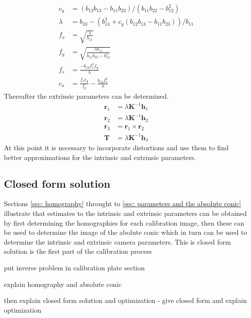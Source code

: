 \begin{align}
	c_y &= (b_{12} b_{13} - b_{11} b_{23})/(b_{11} b_{22} - b_{12}^2) \\
	\lambda &= b_{33} -(b_{13}^2 + c_y(b_{12} b_{13} - b_{11} b_{23}))/b_{11}\\
	f_x &= \sqrt{\frac{\lambda}{b_{11}}} \\
	f_y &= \sqrt{\frac{\lambda b_{11}}{b_{11} b_{22} - b_{12}^2}} \\
	f_s &= \frac{-b_{12} f_x^2 f_y}{\lambda} \\
	c_x &= \frac{f_s c_y}{f_y} - \frac{b_{13} f_x^2}{\lambda}
\end{align}
Thereafter the extrinsic parameters can be determined.
\begin{align}
	\bm{r}_1 &= \lambda \bm{K}^{-1} \bm{h}_1 \\
	\bm{r}_2 &= \lambda \bm{K}^{-1} \bm{h}_2 \\
	\bm{r}_3 &= \bm{r}_1 \times \bm{r}_2 \\
	\bm{T} &= \lambda \bm{K}^{-1} \bm{h}_3
\end{align}
At this point it is necessary to incorporate distortions and use them to find better approximations for the intrinsic and extrinsic parameters.


\subsection{Closed form solution}
Sections \ref{sec: homography} throught to \ref{sec: parameters and the absolute conic} illustrate that estimates to the intrinsic and extrinsic parameters can be obtained by first determining the homographies for each calibration image, then these can be used to determine the image of the abolute conic which in turn can be used to determine the intrinsic and extrinsic camera parameters. This is closed form solution is the first part of the calibration process

put inverse problem in calibration plate section

explain homography and absolute conic

then explain closed form solution and optimization - give closed form and explain optimization


